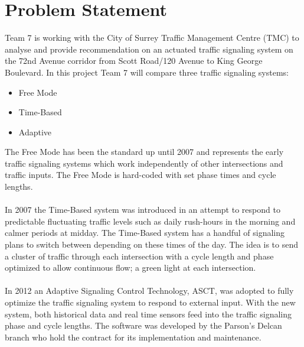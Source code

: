 \titleGM %





\newpage
{}
\section{Problem Statement}

Team 7 is working with the City of Surrey Traffic Management Centre (TMC) to analyse and provide recommendation on an actuated traffic signaling system on the 72nd Avenue corridor from Scott Road/120 Avenue to King George Boulevard. In this project Team 7 will compare three traffic signaling systems:
\begin{itemize}
\item Free Mode
\item Time-Based
\item Adaptive
\end{itemize}
The Free Mode has been the standard up until 2007 and represents the early traffic signaling systems which work independently of other intersections and traffic inputs. The Free Mode is hard-coded with set phase times and cycle lengths. \\ \\
In 2007 the Time-Based system was introduced in an attempt to respond to predictable fluctuating traffic levels such as daily rush-hours in the morning and calmer periods at midday. The Time-Based system has a handful of signaling plans to switch between depending on these times of the day. The idea is to send a cluster of traffic through each intersection with a cycle length and phase optimized to allow continuous flow; a green light at each intersection.\\ \\
In 2012 an Adaptive Signaling Control Technology, ASCT, was adopted to fully optimize the traffic signaling system to respond to external input. With the new system, both historical data and real time sensors feed into the traffic signaling phase and cycle lengths. The software was developed by the Parson’s Delcan branch who hold the contract for its implementation and maintenance.

 



